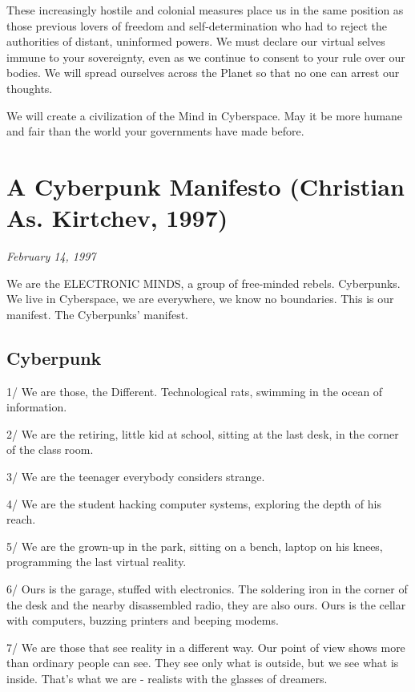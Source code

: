 \documentclass[letterpaper,12pt,english]{sphinxmanual}
\begin{document}
These increasingly hostile and colonial measures place us in the same position as those previous lovers of freedom and self-determination who had to reject the authorities of distant, uninformed powers. We must declare our virtual selves immune to your sovereignty, even as we continue to consent to your rule over our bodies. We will spread ourselves across the Planet so that no one can arrest our thoughts.

We will create a civilization of the Mind in Cyberspace. May it be more humane and fair than the world your governments have made before.


\chapter{A Cyberpunk Manifesto (Christian As. Kirtchev, 1997)}
\label{1997:a-cyberpunk-manifesto-christian-as-kirtchev-1997}\label{1997::doc}\label{1997:index-0}
\emph{February 14, 1997}

We are the ELECTRONIC MINDS, a group of free-minded rebels. Cyberpunks. We live in Cyberspace, we are everywhere, we know no boundaries. This is our manifest. The Cyberpunks' manifest.


\section{Cyberpunk}
\label{1997:cyberpunk}
1/ We are those, the Different. Technological rats, swimming in the ocean of information.

2/ We are the retiring, little kid at school, sitting at the last desk, in the corner of the class room.

3/ We are the teenager everybody considers strange.

4/ We are the student hacking computer systems, exploring the depth of his reach.

5/ We are the grown-up in the park, sitting on a bench, laptop on his knees, programming the last virtual reality.

6/ Ours is the garage, stuffed with electronics. The soldering iron in the corner of the desk and the nearby disassembled radio, they are also ours. Ours is the cellar with computers, buzzing printers and beeping modems.

7/ We are those that see reality in a different way. Our point of view shows more than ordinary people can see. They see only what is outside, but we see what is inside. That's what we are - realists with the glasses of dreamers.
\end{document}

